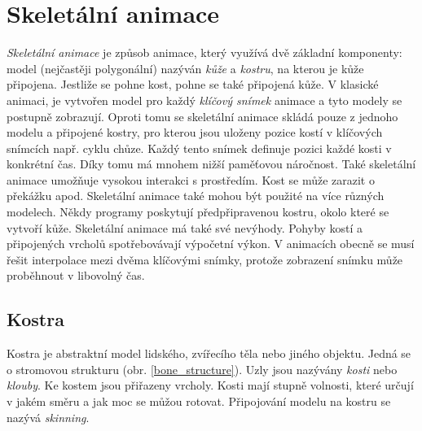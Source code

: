 \chapter{Skeletální animace}
\textit{Skeletální animace} je způsob animace, který využívá dvě základní komponenty: model (nejčastěji polygonální) nazýván \textit{kůže} a \textit{kostru}, na kterou je kůže připojena. Jestliže se pohne kost, pohne se také připojená kůže. V klasické animaci, je vytvořen model pro každý \textit{klíčový snímek} animace a tyto modely se postupně zobrazují. Oproti tomu se skeletální animace skládá pouze z jednoho modelu a připojené kostry, pro kterou jsou uloženy pozice kostí v klíčových snímcích např. cyklu chůze. Každý tento snímek definuje pozici každé kosti v konkrétní čas. Díky tomu má mnohem nižší paměťovou náročnost. Také skeletální animace umožňuje vysokou interakci s prostředím. Kost se může zarazit o překážku apod. Skeletální animace také mohou být použité na více různých modelech. Někdy programy poskytují předpřipravenou kostru, okolo které se vytvoří kůže. Skeletální animace má také své nevýhody. Pohyby kostí a připojených vrcholů spotřebovávají výpočetní výkon. V animacích obecně se musí řešit interpolace mezi dvěma klíčovými snímky, protože zobrazení snímku může proběhnout v libovolný čas.
\section{Kostra}
Kostra je abstraktní model lidského, zvířecího těla nebo jiného objektu. Jedná se o stromovou strukturu (obr. \ref{bone_structure}). Uzly jsou nazývány \textit{kosti} nebo \textit{klouby}. Ke kostem jsou přiřazeny vrcholy. Kosti mají stupně volnosti, které určují v jakém směru a jak moc se můžou rotovat. Připojování modelu na kostru se nazývá \textit{skinning}.

